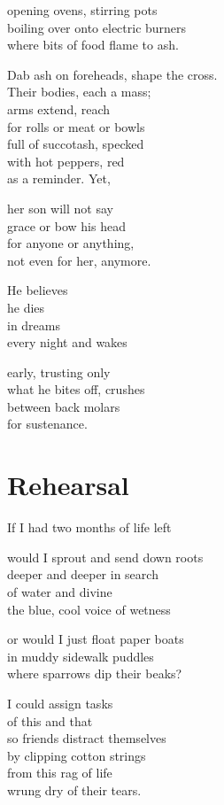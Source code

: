 \documentclass[twoside,10pt]{book}
\begin{document}
opening ovens, stirring pots\\
boiling over onto electric burners\\
where bits of food flame to ash.

Dab ash on foreheads, shape the cross.\\
Their bodies, each a mass;\\
arms extend, reach\\
for rolls or meat or bowls\\
full of succotash, specked\\
with hot peppers, red\\
as a reminder. Yet,

her son will not say\\
grace or bow his head\\
for anyone or anything,\\
not even for her, anymore.

He believes\\
he dies\\
in dreams\\
every night and wakes

early, trusting only\\
what he bites off, crushes\\
between back molars\\
for sustenance.


\clearpage
\section{Rehearsal}

If I had two months of life left

would I sprout and send down roots\\
deeper and deeper in search\\
of water and divine\\
the blue, cool voice of wetness

or would I just float paper boats\\
in muddy sidewalk puddles\\
where sparrows dip their beaks?

I could assign tasks\\
of this and that\\
so friends distract themselves\\
by clipping cotton strings\\
from this rag of life\\
wrung dry of their tears.
\end{document}
